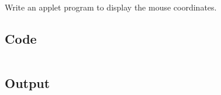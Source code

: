 \documentclass[../main.tex]{subfiles}
\begin{document}
Write an applet program to display the mouse coordinates.

\subsection{Code}
\inputminted[frame=lines, breaklines, breakanywhere, numberblanklines=false]{java}{./programs/prog18/MouseProg.java}

\subsection{Output}
\end{document}
